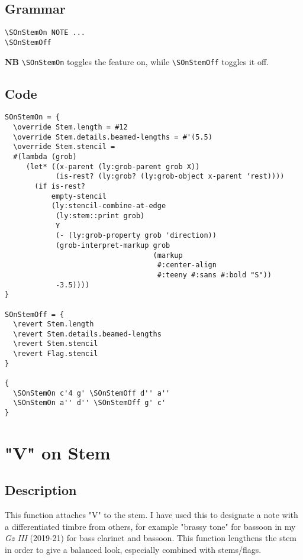 \documentclass[11pt, oneside]{book}   	%
\begin{document}
\subsection{Grammar}
\begin{verbatim}
\SOnStemOn NOTE ...
\SOnStemOff
\end{verbatim}
\textbf{NB} \verb|\SOnStemOn| toggles the feature on, while \verb|\SOnStemOff| toggles it off.

\subsection{Code}
\begin{verbatim}
SOnStemOn = {
  \override Stem.length = #12
  \override Stem.details.beamed-lengths = #'(5.5)
  \override Stem.stencil =
  #(lambda (grob)
     (let* ((x-parent (ly:grob-parent grob X))
            (is-rest? (ly:grob? (ly:grob-object x-parent 'rest))))
       (if is-rest?
           empty-stencil
           (ly:stencil-combine-at-edge
            (ly:stem::print grob)
            Y
            (- (ly:grob-property grob 'direction))
            (grob-interpret-markup grob
                                   (markup
                                    #:center-align
                                    #:teeny #:sans #:bold "S"))
            -3.5))))
}

SOnStemOff = {
  \revert Stem.length
  \revert Stem.details.beamed-lengths
  \revert Stem.stencil
  \revert Flag.stencil
}

{
  \SOnStemOn c'4 g' \SOnStemOff d'' a''
  \SOnStemOn a'' d'' \SOnStemOff g' c'
}
\end{verbatim}
\vfill \break




\section {"V" on Stem}
\hfill

\subsection{Description}
This function attaches "V" to the stem. I have used this to designate a note with a differentiated timbre from others, for example "brassy tone" for bassoon in my \textit{Gz III} (2019-21) for bass clarinet and bassoon. This function lengthens the stem in order to give a balanced look, especially combined with stems/flags. 
\end{document}
